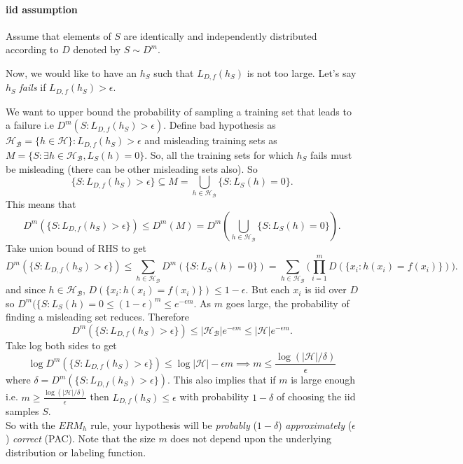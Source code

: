 \paragraph{iid assumption} Assume that elements of $S$ are identically and independently distributed according to $D$ denoted by $S \sim D^m$.

Now, we would like to have an $h_S$ such that $L_{D,f}(h_S)$ is not too large. Let's say $h_S$ \textit{fails} if $L_{D,f}(h_S) > \epsilon$.

We want to upper bound the probability of sampling a training set that leads to a failure i.e $D^m({S: L_{D,f}(h_S) > \epsilon}).$ Define bad hypothesis as $\mathcal{H_B} = \{h \in \mathcal{H}\}: L_{D,f}(h_S) > \epsilon$ and misleading training sets as $M = \{S: \exists h \in \mathcal{H_B}, L_S(h) = 0\}$. So, all the training sets for which $h_S$ fails must be misleading (there can be other misleading sets also). So
\[
	\{S: L_{D,f}(h_S) > \epsilon \} \subseteq M = \bigcup_{h \in \mathcal{H_B}} \{S:  L_S(h) = 0\}.
\]
This means that 
\[
	D^m(\{S: L_{D,f}(h_S) > \epsilon \}) \leq D^m(M) = D^m(\bigcup_{h \in \mathcal{H_B}}\{S: L_S(h) = 0\}).
\]
Take union bound of RHS to get 
\[
	D^m(\{S: L_{D,f}(h_S) > \epsilon \}) \leq \sum_{h \in \mathcal{H_B}} D^m(\{S: L_S(h) = 0\}) = \sum_{h \in \mathcal{H_B}} \bigg(\prod_{i=1}^{m} D(\{x_i: h(x_i) = f(x_i)\})\bigg).
\]
and since $h \in \mathcal{H_B}$, $D(\{x_i: h(x_i) = f(x_i)\}) \leq 1 - \epsilon$. But each $x_i$ is iid over $D$ so $D^m(\{S: L_S(h) = 0 \leq (1-\epsilon)^m \leq e^{-\epsilon m}$. As $m$ goes large, the probability of finding a misleading set reduces. Therefore
\[
	D^m(\{S: L_{D,f}(h_S) > \epsilon \}) \leq |\mathcal{H_B}|e^{-\epsilon m} \leq |\mathcal{H}|e^{-\epsilon m}.
\]
Take log both sides to get
\[
\log D^m(\{S: L_{D,f}(h_S) > \epsilon \})  \leq \log |\mathcal{H}| - \epsilon m \implies m \leq \frac{\log( |\mathcal{H}|/\delta)}{\epsilon}
\]
where $\delta = D^m(\{S: L_{D,f}(h_S) > \epsilon \})$. This also implies that if $m$ is large enough i.e. $ m \geq \frac{\log( |\mathcal{H}|/\delta)}{\epsilon}$ then $L_{D,f}(h_S) \leq \epsilon$ with probability $1 - \delta$ of choosing the iid samples $S$. \\

So with the $ERM_h$ rule, your hypothesis will be \textit{probably} ($1-\delta$) \textit{approximately} ($\epsilon$) \textit{correct} (PAC). Note that the size $m$ does not depend upon the underlying distribution or labeling function.

